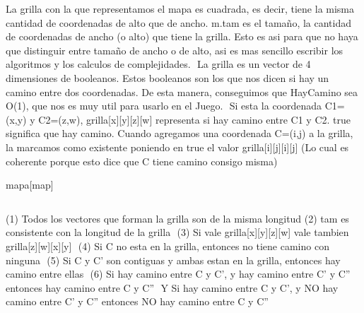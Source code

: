 \begin{Representacion}

La grilla con la que representamos el mapa es cuadrada, es decir, tiene la misma cantidad de coordenadas de alto que de ancho. m.tam es el tama\~no, la cantidad de coordenadas de ancho (o alto) que tiene la grilla. Esto es asi para que no haya que distinguir entre tama\~no de ancho o de alto, asi es mas sencillo escribir los algoritmos y los calculos de complejidades.
$ $\newline
La grilla es un vector de 4 dimensiones de booleanos. Estos booleanos son los que nos dicen si hay un camino entre dos coordenadas. De esta manera, conseguimos que HayCamino sea O(1), que nos es muy util para usarlo en el Juego.
$ $\newline
Si esta la coordenada C1=(x,y) y C2=(z,w), grilla[x][y][z][w] representa si hay camino entre C1 y C2. true significa que hay camino. Cuando agregamos una coordenada C=(i,j) a la grilla, la marcamos como existente poniendo en true el valor grilla[i][j][i][j] (Lo cual es coherente porque esto dice que C tiene camino consigo misma)

\begin{Estructura}{mapa}[map]
	\begin{Tupla}[map]  
  	\end{Tupla}
  	
\end{Estructura}



$ $\newline

(1) Todos los vectores que forman la grilla son de la misma longitud$ $\newline
(2) tam es consistente con la longitud de la grilla $ $\newline
(3) Si vale grilla[x][y][z][w] vale tambien grilla[z][w][x][y] $ $\newline
(4) Si C no esta en la grilla, entonces no tiene camino con ninguna $ $\newline
(5) Si C y C' son contiguas y ambas estan en la grilla, entonces hay camino entre ellas $ $\newline
(6) Si hay camino entre C y C', y hay camino entre C' y C'' entonces hay camino entre C y C'' $ $\newline
Y Si hay camino entre C y C', y NO hay camino entre C' y C'' entonces NO hay camino entre C y C'' $ $\newline


\end{Representacion}
